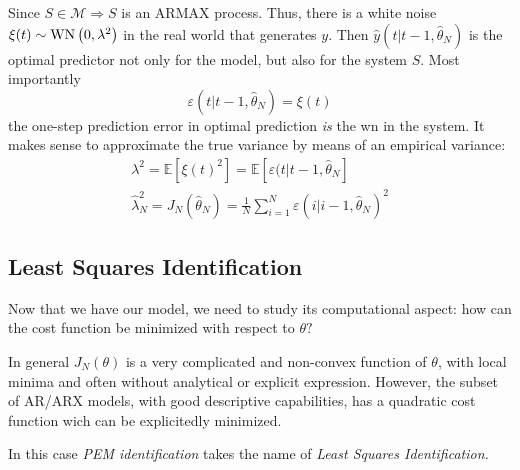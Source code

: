 Since $ S\in \mathcal{M} \Longrightarrow S$ is an ARMAX process. Thus, there is a white noise $ \xi ( t) \sim \operatorname{WN}\left( 0,\lambda ^{2}\right)$ in the real world that generates $ y$. Then $ \hat{y}( t|t-1,\hat{\theta }_{N})$ is the optimal predictor not only for the model, but also for the system $ S$. Most importantly
\begin{equation*}
\varepsilon ( t|t-1,\hat{\theta }_{N}) =\xi ( t)
\end{equation*}
the one-step prediction error in optimal prediction \textit{is} the \gls{wn} in the system. It makes sense to approximate the true variance by means of an empirical variance:
\begin{gather*}
\lambda ^{2} =\mathbb{E}\left[ \xi ( t)^{2}\right] =\mathbb{E}[ \varepsilon ( t|t-1,\hat{\theta }_{N}]\\
\hat{\lambda }_{N}^{2} =J_{N}(\hat{\theta }_{N}) =\frac{1}{N}\sum _{i=1}^{N} \varepsilon ( i|i-1,\hat{\theta }_{N})^{2}
\end{gather*}

\subsection{Least Squares Identification}
Now that we have our model, we need to study its computational aspect: how can the cost function be minimized with respect to $ \theta ?$

In general $ J_{N}( \theta )$ is a very complicated and non-convex function of $ \theta $, with local minima and often without analytical or explicit expression. However, the subset of AR/ARX models, with good descriptive capabilities, has a quadratic cost function wich can be explicitedly minimized.

In this case \textit{PEM identification} takes the name of \textit{Least Squares Identification. }

